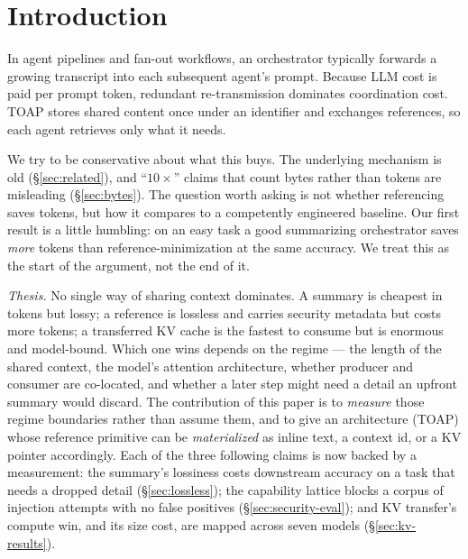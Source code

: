 \documentclass[11pt]{article}
\begin{document}
\begin{abstract}
(35/36 cells byte-identical; up to $\sim$180$\times$ at long context), but the cache is thousands of
times larger than the text, so it only pays off when agents are co-located or use grouped-query
attention. That last result grounds TOAP's gating policy in measurement rather than assumption.
Throughout we separate wire bytes from model tokens, and show symbolic ``opcodes'' save 50\% of bytes
but only 0--17\% of tokens. We describe the protocol architecture (a two-plane wire format; a
reference-materialization spectrum) and a Rust reference implementation. \emph{Threats to validity are
first-class}: a single model family/tokenizer for the token study, a same-family judge as a secondary
check only, and small $n$. The mechanism is not novel (blackboard systems, A2A artifacts, ADOL); the
contribution is the honest, reproducible accounting.
\end{abstract}

\section{Introduction}
In agent pipelines and fan-out workflows, an orchestrator typically forwards a growing transcript into
each subsequent agent's prompt. Because LLM cost is paid per prompt token, redundant re-transmission
dominates coordination cost. TOAP stores shared content once under an identifier and exchanges
references, so each agent retrieves only what it needs.

We try to be conservative about what this buys. The underlying mechanism is old (\S\ref{sec:related}),
and ``$10\times$'' claims that count bytes rather than tokens are misleading (\S\ref{sec:bytes}). The
question worth asking is not whether referencing saves tokens, but how it compares to a competently
engineered baseline. Our first result is a little humbling: on an easy task a good summarizing
orchestrator saves \emph{more} tokens than reference-minimization at the same accuracy. We treat this
as the start of the argument, not the end of it.

\emph{Thesis.} No single way of sharing context dominates. A summary is cheapest in tokens but lossy;
a reference is lossless and carries security metadata but costs more tokens; a transferred KV cache is
the fastest to consume but is enormous and model-bound. Which one wins depends on the regime --- the
length of the shared context, the model's attention architecture, whether producer and consumer are
co-located, and whether a later step might need a detail an upfront summary would discard. The
contribution of this paper is to \emph{measure} those regime boundaries rather than assume them, and to
give an architecture (TOAP) whose reference primitive can be \emph{materialized} as inline text, a
context id, or a KV pointer accordingly. Each of the three following claims is now backed by a
measurement: the summary's lossiness costs downstream accuracy on a task that needs a dropped detail
(\S\ref{sec:lossless}); the capability lattice blocks a corpus of injection attempts with no false
positives (\S\ref{sec:security-eval}); and KV transfer's compute win, and its size cost, are mapped
across seven models (\S\ref{sec:kv-results}).
\end{document}

